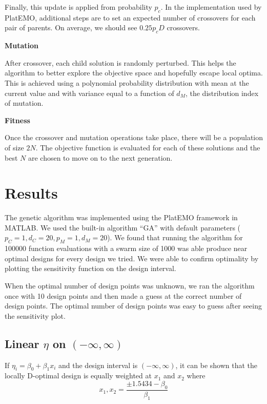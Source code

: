 \documentclass[11pt,a4paper]{article}
\begin{document}
Finally, this update is applied from probability $p_c$. In the implementation used by PlatEMO, additional steps are to set an expected number of crossovers for each pair of parents. On average, we should see $0.25 p_cD$ crossovers. 

\begin{flushleft}
\textbf{Mutation}
\end{flushleft}
After crossover, each child solution is randomly perturbed. This helps the algorithm to better explore the objective space and hopefully escape local optima. This is achieved using a polynomial probability distribution with mean at the current value and with variance equal to a function of $d_M$, the distribution index of mutation.



\begin{flushleft}
\textbf{Fitness}
\end{flushleft}
Once the crossover and mutation operations take place, there will be a population of size $2N$. The objective function is evaluated for each of these solutions and the best $N$ are chosen to move on to the next generation.



\section{Results}
The genetic algorithm was implemented using the PlatEMO framework in MATLAB. We used the built-in algorithm ``GA'' with default parameters ($p_C = 1, d_C = 20, p_M = 1, d_M = 20$). We found that running the algorithm for 100000 function evaluations with a swarm size of 1000 was able produce near optimal designs for every design we tried. We were able to confirm optimality by plotting the sensitivity function on the design interval.

When the optimal number of design points was unknown, we ran the algorithm once with 10 design points and then made a guess at the correct number of design points. The optimal number of design points was easy to guess after seeing the sensitivity plot.

\subsection{Linear $\eta$ on $(-\infty, \infty)$}
If $\eta_i = \beta_0 + \beta_1 x_i$ and the design interval is $(-\infty, \infty)$, it can be shown that the locally D-optimal design is equally weighted at $x_1$ and $x_2$ where
$$
x_1, x_2 = \frac{\pm 1.5434 - \beta_0}{\beta_1}
$$
\end{document}
